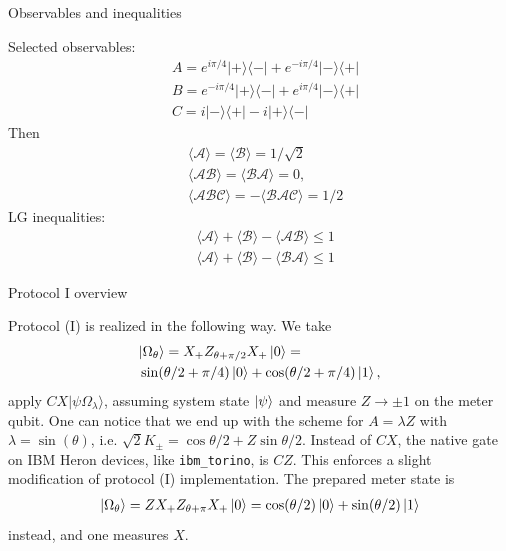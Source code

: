 \documentclass{beamer}
\begin{document}
	\begin{frame}{Observables and inequalities}
		
		Selected observables:
		\begin{align*}
			&A=e^{i\pi/4}|+\rangle\langle -|+e^{-i\pi/4}|-\rangle\langle +|\nonumber\\
			&B=e^{-i\pi/4}|+\rangle\langle -|+e^{i\pi/4}|-\rangle\langle +|\nonumber\\
			&C=i|-\rangle\langle+|-i|+\rangle\langle -|
		\end{align*}
		Then 
		\begin{align*}
			&\langle \mathcal A\rangle=\langle\mathcal B\rangle=1/\sqrt{2}\nonumber\\
			&\langle \mathcal A\mathcal B\rangle=\langle \mathcal B\mathcal A\rangle=0,\nonumber\\
			&\langle \mathcal A\mathcal B\mathcal C\rangle=-\langle \mathcal B\mathcal A\mathcal C\rangle=1/2
		\end{align*}
		LG inequalities:
		\begin{align*}
			&\langle\mathcal A\rangle+\langle\mathcal B\rangle-\langle\mathcal A\mathcal B\rangle\leq 1\nonumber\\
			&\langle\mathcal A\rangle+\langle\mathcal B\rangle-\langle\mathcal B\mathcal A\rangle\leq 1
			\label{lgg}
		\end{align*}
		
	\end{frame}
	
	\begin{frame}{Protocol I overview}
		
		Protocol (I) is realized in the following way. We take
		\begin{align}
			&|\Omega_\theta\rangle=X_+Z_{\theta+\pi/2} X_+\ket 0=\nonumber\\
			&\sin(\theta/2+\pi/4)\ket 0+\cos(\theta/2+\pi/4)\ket 1,
		\end{align}
		apply $CX|\psi\Omega_\lambda\rangle$, assuming system state $\ket \psi $ and
		measure $Z\to\pm 1$ on the meter qubit. One can notice that we end up with the scheme
		for $A=\lambda Z$ with $\lambda=\sin(\theta)$, i.e. $\sqrt{2}K_\pm=\cos\theta/2+Z\sin\theta/2.$
		Instead of $CX$, the native gate on IBM Heron devices, like \texttt{ibm\_torino}, is $CZ$.
		 This enforces a slight modification of protocol (I) implementation.
		The prepared meter state is 
		\begin{align}
		|\Omega_\theta\rangle=ZX_+Z_{\theta+\pi} X_+\ket 0=\cos(\theta/2)\ket 0+\sin(\theta/2)\ket 1
		\end{align}
		instead, and one measures $X$.
	
	\end{frame}
	
\end{document}
